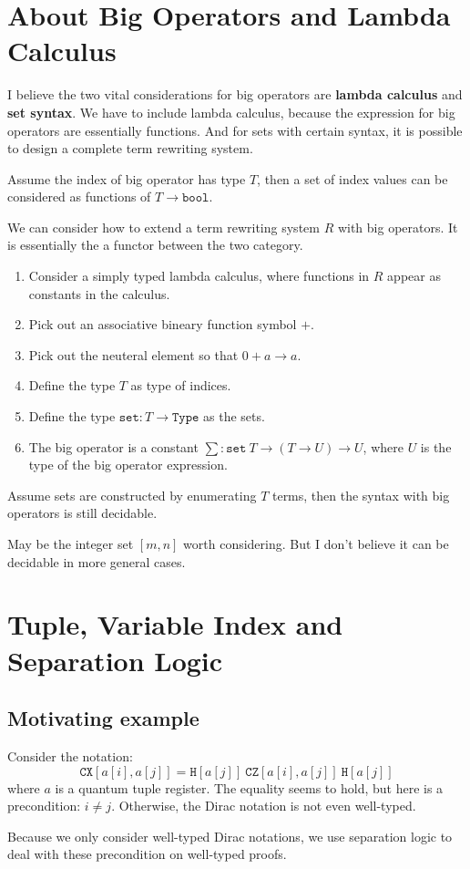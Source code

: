 \section{About Big Operators and Lambda Calculus}
I believe the two vital considerations for big operators are \textbf{lambda calculus} and \textbf{set syntax}. We have to include lambda calculus, because the expression for big operators are essentially functions. And for sets with certain syntax, it is possible to design a complete term rewriting system.

Assume the index of big operator has type $T$, then a set of index values can be considered as functions of $T \to \texttt{bool}$.

\begin{example}
  We can consider how to extend a term rewriting system $R$ with big operators. It is essentially the a functor between the two category.

  \begin{enumerate}
    \item Consider a simply typed lambda calculus, where functions in $R$ appear as constants in the calculus.
    \item Pick out an associative bineary function symbol $+$.
    \item Pick out the neuteral element so that $0 + a \to a$.
    \item Define the type $T$ as type of indices.
    \item Define the type $\texttt{set} : T \to \texttt{Type}$ as the sets.
    \item The big operator is a constant $\sum : \texttt{set}\ T \to (T \to U) \to U$, where $U$ is the type of the big operator expression.
  \end{enumerate}
\end{example}


\begin{example}
  Assume sets are constructed by enumerating $T$ terms, then the syntax with big operators is still decidable.
\end{example}

May be the integer set $[m, n]$ worth considering. But I don't believe it can be decidable in more general cases.


\section{Tuple, Variable Index and Separation Logic}

\subsection{Motivating example}

Consider the notation:
$$
\texttt{CX}[a[i], a[j]] = \texttt{H}[a[j]]\ \texttt{CZ}[a[i], a[j]]\ \texttt{H}[a[j]]
$$
where $a$ is a quantum tuple register. The equality seems to hold, but here is a precondition: $i \neq j$. Otherwise, the Dirac notation is not even well-typed. 

Because we only consider well-typed Dirac notations, we use separation logic to deal with these precondition on well-typed proofs.